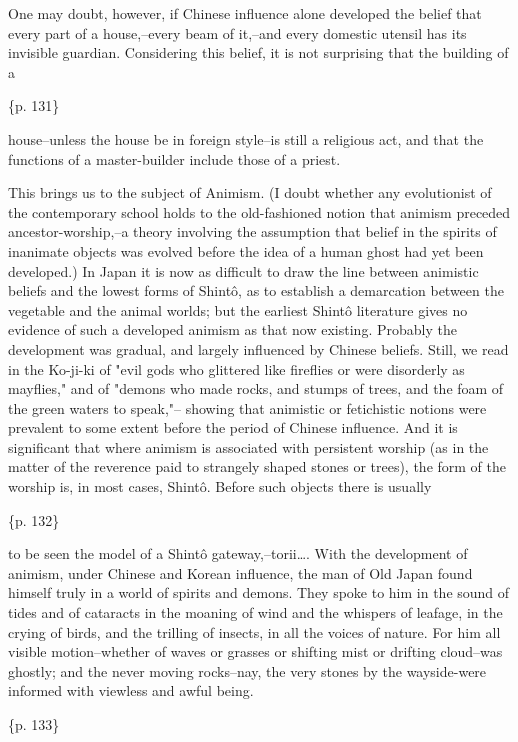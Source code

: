 One may doubt, however, if Chinese influence alone developed the belief that every part of a house,--every beam of it,--and every domestic utensil has its invisible guardian. Considering this belief, it is not surprising that the building of a

\{p. 131\}

house--unless the house be in foreign style--is still a religious act, and that the functions of a master-builder include those of a priest.



This brings us to the subject of Animism. (I doubt whether any evolutionist of the contemporary school holds to the old-fashioned notion that animism preceded ancestor-worship,--a theory involving the assumption that belief in the spirits of inanimate objects was evolved before the idea of a human ghost had yet been developed.) In Japan it is now as difficult to draw the line between animistic beliefs and the lowest forms of Shintô, as to establish a demarcation between the vegetable and the animal worlds; but the earliest Shintô literature gives no evidence of such a developed animism as that now existing. Probably the development was gradual, and largely influenced by Chinese beliefs. Still, we read in the Ko-ji-ki of "evil gods who glittered like fireflies or were disorderly as mayflies," and of "demons who made rocks, and stumps of trees, and the foam of the green waters to speak,"-- showing that animistic or fetichistic notions were prevalent to some extent before the period of Chinese influence. And it is significant that where animism is associated with persistent worship (as in the matter of the reverence paid to strangely shaped stones or trees), the form of the worship is, in most cases, Shintô. Before such objects there is usually

\{p. 132\}

to be seen the model of a Shintô gateway,--torii\ldots{}. With the development of animism, under Chinese and Korean influence, the man of Old Japan found himself truly in a world of spirits and demons. They spoke to him in the sound of tides and of cataracts in the moaning of wind and the whispers of leafage, in the crying of birds, and the trilling of insects, in all the voices of nature. For him all visible motion--whether of waves or grasses or shifting mist or drifting cloud--was ghostly; and the never moving rocks--nay, the very stones by the wayside-were informed with viewless and awful being.

\{p. 133\}

